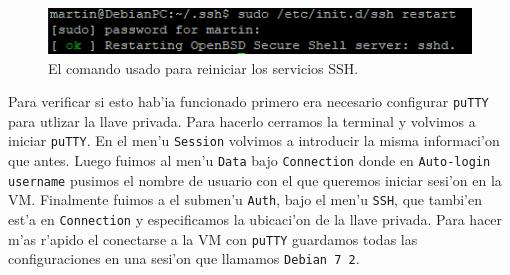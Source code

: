 \documentclass[11pt]{article}
\begin{document}
		\begin{figure}[H]
    			\centering
    			\includegraphics[scale=0.9]{Images/Connection/ssh_restart.PNG}
    			\caption{El comando usado para reiniciar los servicios SSH.}
    			\label{fig:ssh_restart}
		\end{figure}
		
		Para verificar si esto hab'ia funcionado primero era necesario configurar \texttt{puTTY} para utlizar la llave privada. Para hacerlo cerramos la terminal y volvimos a iniciar \texttt{puTTY}. En el men'u \texttt{Session} volvimos a introducir la misma informaci'on que antes. Luego fuimos al men'u \texttt{Data} bajo \texttt{Connection} donde en \texttt{Auto-login username} pusimos el nombre de usuario con el que queremos iniciar sesi'on en la VM. Finalmente fuimos a el submen'u \texttt{Auth}, bajo el men'u \texttt{SSH}, que tambi'en est'a en \texttt{Connection} y especificamos la ubicaci'on de la llave privada. Para hacer m'as r'apido el conectarse a la VM con \texttt{puTTY} guardamos todas las configuraciones en una sesi'on que llamamos \texttt{Debian 7 2}.
		
\end{document}
